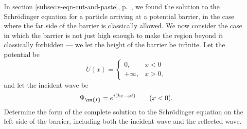 In section \ref{subsec:s-eqn-cut-and-paste}, p.~\pageref{subsec:s-eqn-cut-and-paste},
we found the solution to the Schr\"odinger
equation for a particle arriving at a potential barrier, in the case where the
far side of the barrier is classically allowed. We now consider the case in which
the barrier is not just high enough to make the region beyond it classically
forbidden --- we let the height of the barrier be infinite. Let the potential
be
\begin{equation*}
  U(x) = \begin{cases}
    0, & x< 0 \\
    +\infty, & x> 0,
  \end{cases}
\end{equation*}
and let the incident wave be
\begin{equation*}
  \Psi_\zu{I} = e^{i(kx-\omega t)} \qquad \text{($x< 0$)}.
\end{equation*}
Determine the form of the complete solution to the Schr\"odinger
equation on the left side of the barrier, including both
the incident wave and the reflected wave.\answercheck
